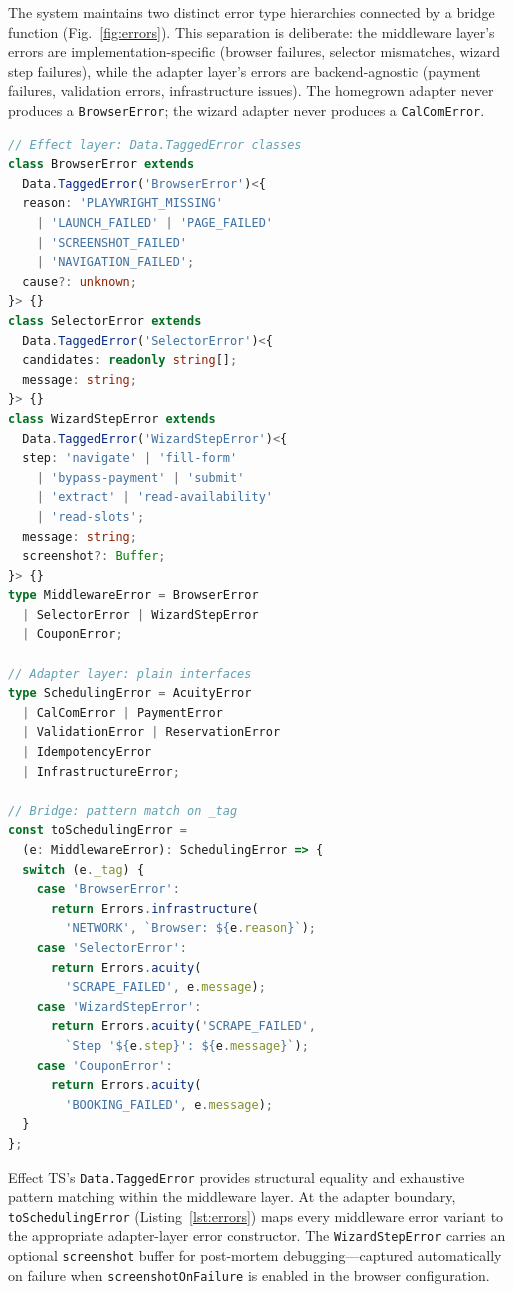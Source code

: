 \documentclass[conference]{IEEEtran}
\begin{document}
The system maintains two distinct error type hierarchies connected by a bridge function (Fig.~\ref{fig:errors}). This separation is deliberate: the middleware layer's errors are implementation-specific (browser failures, selector mismatches, wizard step failures), while the adapter layer's errors are backend-agnostic (payment failures, validation errors, infrastructure issues). The homegrown adapter never produces a \texttt{BrowserError}; the wizard adapter never produces a \texttt{CalComError}.

\begin{lstlisting}[language=TypeScript,caption={Dual error hierarchies with bridge function},label={lst:errors}]
// Effect layer: Data.TaggedError classes
class BrowserError extends
  Data.TaggedError('BrowserError')<{
  reason: 'PLAYWRIGHT_MISSING'
    | 'LAUNCH_FAILED' | 'PAGE_FAILED'
    | 'SCREENSHOT_FAILED'
    | 'NAVIGATION_FAILED';
  cause?: unknown;
}> {}
class SelectorError extends
  Data.TaggedError('SelectorError')<{
  candidates: readonly string[];
  message: string;
}> {}
class WizardStepError extends
  Data.TaggedError('WizardStepError')<{
  step: 'navigate' | 'fill-form'
    | 'bypass-payment' | 'submit'
    | 'extract' | 'read-availability'
    | 'read-slots';
  message: string;
  screenshot?: Buffer;
}> {}
type MiddlewareError = BrowserError
  | SelectorError | WizardStepError
  | CouponError;

// Adapter layer: plain interfaces
type SchedulingError = AcuityError
  | CalComError | PaymentError
  | ValidationError | ReservationError
  | IdempotencyError
  | InfrastructureError;

// Bridge: pattern match on _tag
const toSchedulingError =
  (e: MiddlewareError): SchedulingError => {
  switch (e._tag) {
    case 'BrowserError':
      return Errors.infrastructure(
        'NETWORK', `Browser: ${e.reason}`);
    case 'SelectorError':
      return Errors.acuity(
        'SCRAPE_FAILED', e.message);
    case 'WizardStepError':
      return Errors.acuity('SCRAPE_FAILED',
        `Step '${e.step}': ${e.message}`);
    case 'CouponError':
      return Errors.acuity(
        'BOOKING_FAILED', e.message);
  }
};
\end{lstlisting}

Effect TS's \texttt{Data.TaggedError} provides structural equality and exhaustive pattern matching within the middleware layer. At the adapter boundary, \texttt{toSchedulingError} (Listing~\ref{lst:errors}) maps every middleware error variant to the appropriate adapter-layer error constructor. The \texttt{WizardStepError} carries an optional \texttt{screenshot} buffer for post-mortem debugging---captured automatically on failure when \texttt{screenshotOnFailure} is enabled in the browser configuration.
\end{document}
